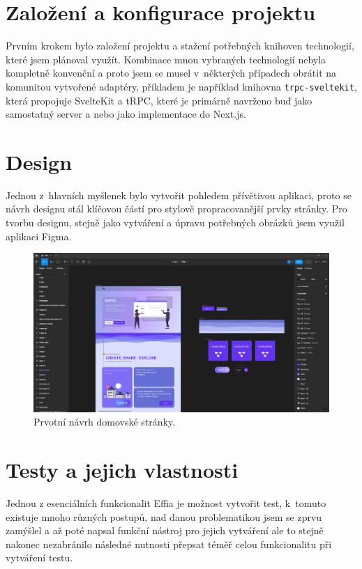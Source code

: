 \documentclass[12pt, a4paper,
openright
]{report}
\begin{document}
\section{Založení a konfigurace projektu}
Prvním krokem bylo založení projektu a stažení potřebných knihoven technologií, které jsem plánoval využít. Kombinace mnou vybraných technologií nebyla kompletně konvenční a proto jsem se musel v~některých případech obrátit na komunitou vytvořené adaptéry, příkladem je například knihovna \texttt{trpc-sveltekit}, která propojuje SvelteKit a tRPC, které je primárně navrženo buď jako samostatný server a nebo jako implementace do Next.js.

\clearpage
\section{Design}
Jednou z~hlavních myšlenek bylo vytvořit pohledem přívětivou aplikaci, proto se návrh designu stál klíčovou částí pro stylově propracovanější prvky stránky. Pro tvorbu designu, stejně jako vytváření a úpravu potřebných obrázků jsem využil aplikaci Figma.
\begin{figure}[h]
	\centering %
	\includegraphics[width=1\linewidth]{image/figma.png} 
	\caption{Prvotní návrh domovské stránky.} %
	\label{fig:figma} %
\end{figure}

\section{Testy a jejich vlastnosti}
Jednou z esenciálních funkcionalit Effia je možnost vytvořit test, k~tomuto existuje mnoho různých postupů, nad danou problematikou jsem se zprvu zamýšlel a až poté napsal funkční nástroj pro jejich vytváření ale to stejně nakonec nezabránilo následné nutnosti přepsat téměř celou funkcionalitu při vytváření testu.
\end{document}
